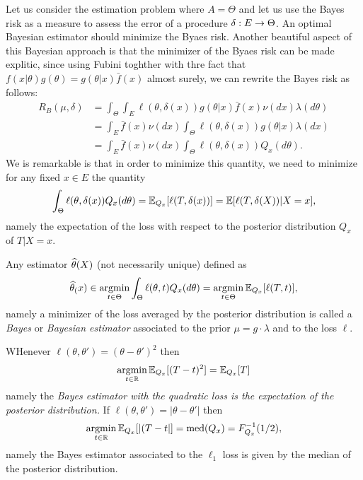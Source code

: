 Let us consider the estimation problem where $A = \Theta$ and let us use the Bayes risk as a measure to assess the error of a procedure $\delta : E \rightarrow \Theta$.
An optimal Bayesian estimator should minimize the Byaes risk. 
Another beautiful aspect of this Bayesian approach is that the minimizer of the Byaes risk can be made explitic, since using Fubini toghther with thre fact that $f(x | \theta) g(\theta) = g(\theta | x) \bar f(x)$ almost surely, we can rewrite the Bayes risk as follows:
\begin{align*}
	R_B(\mu, \delta) &= \int_{\Theta} \int_E \ell(\theta, \delta(x)) g(\theta | x) \bar f(x) \nu(dx) \lambda(d \theta) \\
	&= \int_E \bar f(x) \nu(dx) \int_{\Theta} \ell(\theta, \delta(x)) g(\theta | x) \lambda(dx) \\
	&=  \int_E \bar f(x) \nu(dx) \int_{\Theta} \ell(\theta, \delta(x)) Q_x(d \theta).
\end{align*}
We is remarkable is that in order to minimize this quantity, we need to minimize for any fixed $x \in E$ the quantity
\begin{equation*}
	\int_{\Theta} \ell(\theta, \delta(x)) Q_x(d \theta) = \mathbb E_{Q_x} [\ell(T, \delta(x))] 
	= \mathbb E [\ell(T, \delta(X)) | X = x],
\end{equation*}
namely the expectation of the loss with respect to the posterior distribution $Q_x$ of $T | X = x$.
\begin{definition}
	Any estimator $\widehat \theta(X)$ (not necessarily unique) defined as 
	\begin{equation*}
		\widehat \theta_(x) \in \operatorname*{argmin}_{t \in \Theta} \int_{\Theta} \ell(\theta, t) Q_x(d \theta) 
		= \operatorname*{argmin}_{t \in \Theta} \mathbb E_{Q_x} [\ell(T, t) ],
	\end{equation*}
	namely a minimizer of the loss averaged by the posterior distribution is called a \emph{Bayes} or \emph{Bayesian estimator} associated to the prior $\mu = g \cdot \lambda$ and to the loss $\ell$.
\end{definition}

WHenever $\ell(\theta, \theta') = (\theta - \theta')^2$ then
\begin{equation*}
	\operatorname*{argmin}_{t \in \mathbb R} \mathbb E_{Q_x}[ (T - t)^2] = \mathbb E_{Q_x}[T]
\end{equation*}
namely the \emph{Bayes estimator with the quadratic loss is the expectation of the posterior distribution.}
If $\ell(\theta, \theta') = |\theta - \theta'|$ then 
\begin{equation*}
	\operatorname*{argmin}_{t \in \mathbb R} \mathbb E_{Q_x}[ |(T - t| ] = \operatorname{med}(Q_x) = F_{Q_x}^{-1}(1/2),
\end{equation*}
namely the Bayes estimator associated to the $\ell_1$ loss is given by the median of the posterior distribution. 


